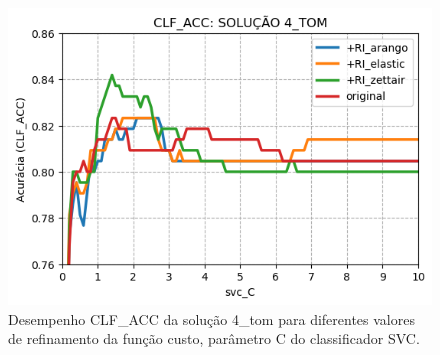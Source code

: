 \begin{figure}[h]
    \centering
    \caption{Desempenho CLF\_ACC da solução 4\_tom para diferentes valores de refinamento da função custo, parâmetro C do classificador SVC.}
    \vspace{-0.0cm}
    \begin{center}
        \includegraphics[width=1.0\textwidth]{img/clf-acc-4-tom.png}
    \end{center}
    \vspace{-0.0cm}
    \label{fig:clf-acc-4-tom}
\end{figure}